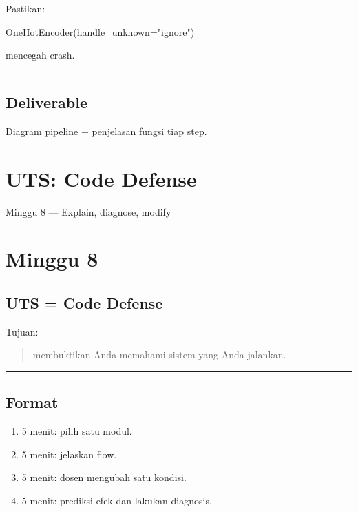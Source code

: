 \documentclass[
  indonesian,
  letterpaper,
  DIV=11,
  numbers=noendperiod]{scrreprt}
\newenvironment{Shaded}{\begin{snugshade}}{\end{snugshade}}
\newcommand{\NormalTok}[1]{\textcolor[rgb]{0.00,0.23,0.31}{#1}}
\newcommand{\OperatorTok}[1]{\textcolor[rgb]{0.37,0.37,0.37}{#1}}
\newcommand{\StringTok}[1]{\textcolor[rgb]{0.13,0.47,0.30}{#1}}
\providecommand{\tightlist}{%
  \setlength{\itemsep}{0pt}\setlength{\parskip}{0pt}}
\begin{document}
Pastikan:

\begin{Shaded}
\begin{Highlighting}[]
\NormalTok{OneHotEncoder(handle\_unknown}\OperatorTok{=}\StringTok{"ignore"}\NormalTok{)}
\end{Highlighting}
\end{Shaded}

mencegah crash.

\begin{center}\rule{0.5\linewidth}{0.5pt}\end{center}

\section{Deliverable}\label{deliverable-3}

Diagram pipeline + penjelasan fungsi tiap step.

\chapter{UTS: Code Defense}\label{uts-code-defense}

Minggu 8 --- Explain, diagnose, modify

\hfill\break

\chapter{Minggu 8}\label{minggu-8}

\section{UTS = Code Defense}\label{uts-code-defense-1}

Tujuan:

\begin{quote}
membuktikan Anda memahami sistem yang Anda jalankan.
\end{quote}

\begin{center}\rule{0.5\linewidth}{0.5pt}\end{center}

\section{Format}\label{format}

\begin{enumerate}
\def\labelenumi{\arabic{enumi}.}
\tightlist
\item
  5 menit: pilih satu modul.
\item
  5 menit: jelaskan flow.
\item
  5 menit: dosen mengubah satu kondisi.
\item
  5 menit: prediksi efek dan lakukan diagnosis.
\end{enumerate}
\end{document}
